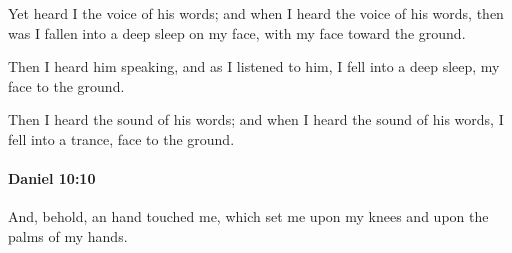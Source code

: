 			\begin{versebox}
					\item[BHS] 
					\item[LXX] 
					\item[ASV] Yet heard I the voice of his words; and when I heard the voice of his words, then was I fallen into a deep sleep on my face, with my face toward the ground.
					\item[NIV] Then I heard him speaking, and as I listened to him, I fell into a deep sleep, my face to the ground.
					\item[NRSV] Then I heard the sound of his words; and when I heard the sound of his words, I fell into a trance, face to the ground.
			\end{versebox}

		\paragraph{Daniel 10:10} %
			\label{DANIEL-10-10}

			And, behold, an hand touched me, which set me upon my knees and upon the palms of my hands.

